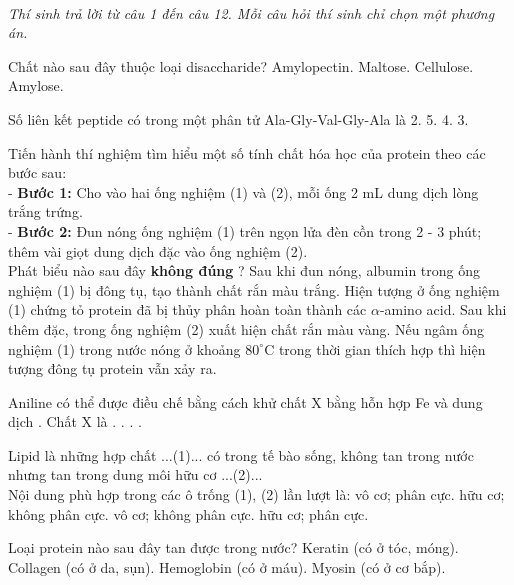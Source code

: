 \documentclass[11pt,a4paper]{article}
\begin{document}
 \\
\textit{Thí sinh trả lời từ câu 1 đến câu 12. Mỗi câu hỏi thí sinh chỉ chọn một phương án.}
\vspace{4pt}
\begin{ex}
Chất nào sau đây thuộc loại disaccharide?
\choice
{Amylopectin.}
{Maltose.}
{Cellulose.}
{Amylose.}
\loigiai{}
\end{ex}
\begin{ex}
Số liên kết peptide có trong một phân tử Ala-Gly-Val-Gly-Ala là
\choice
{2.}
{5.}
{4.}
{3.}
\loigiai{}
\end{ex}
\begin{ex}
Tiến hành thí nghiệm tìm hiểu một số tính chất hóa học của protein theo các bước sau:\\- \textbf{Bước 1:} Cho vào hai ống nghiệm (1) và (2), mỗi ống 2 mL dung dịch lòng trắng trứng.\\- \textbf{Bước 2:} Đun nóng ống nghiệm (1) trên ngọn lửa đèn cồn trong 2 - 3 phút; thêm vài giọt dung dịch  đặc vào ống nghiệm (2).\\Phát biểu nào sau đây \textbf{không đúng} ?
\choice
{Sau khi đun nóng, albumin trong ống nghiệm (1) bị đông tụ, tạo thành chất rắn màu trắng.}
{Hiện tượng ở ống nghiệm (1) chứng tỏ protein đã bị thủy phân hoàn toàn thành các $\alpha$-amino acid.}
{Sau khi thêm  đặc, trong ống nghiệm (2) xuất hiện chất rắn màu vàng.}
{Nếu ngâm ống nghiệm (1) trong nước nóng ở khoảng $80^\circ\text{C}$ trong thời gian thích hợp thì hiện tượng đông tụ protein vẫn xảy ra.}
\loigiai{}
\end{ex}
\begin{ex}
Aniline có thể được điều chế bằng cách khử chất X bằng hỗn hợp Fe và dung dịch . Chất X là
\choice
{.}
{.}
{.}
{.}
\loigiai{}
\end{ex}
\begin{ex}
Lipid là những hợp chất ...(1)... có trong tế bào sống, không tan trong nước nhưng tan trong dung môi hữu cơ ...(2)...\\Nội dung phù hợp trong các ô trống (1), (2) lần lượt là:
\choice
{vô cơ; phân cực.}
{hữu cơ; không phân cực.}
{vô cơ; không phân cực.}
{hữu cơ; phân cực.}
\loigiai{}
\end{ex}
\begin{ex}
Loại protein nào sau đây tan được trong nước?
\choice
{Keratin (có ở tóc, móng).}
{Collagen (có ở da, sụn).}
{Hemoglobin (có ở máu).}
{Myosin (có ở cơ bắp).}
\loigiai{}
\end{ex}
\end{document}
